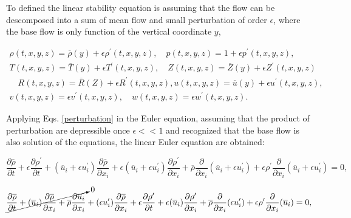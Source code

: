 
To defined the linear stability equation is assuming that 
the flow can be descomposed  into  a sum of mean flow and 
small perturbation of order $\epsilon$, where the base flow 
is only function of the vertical coordinate $y$,  

\begin{equation}
\begin{split}
   \rho(t,x,y,z)=\overline{\rho}(y)+\epsilon\rho^\prime(t,x,y,z) 
   ,
   \quad
   p(t,x,y,z)=1+\epsilon p^\prime(t,x,y,z) 
   ,
   \\
   T(t,x,y,z)=\overline{T}(y)+\epsilon T^\prime(t,x,y,z) 
   ,
   \quad
   Z(t,x,y,z)=\overline{Z}(y)+\epsilon Z^\prime(t,x,y,z) 
    \\
   \quad
   R(t,x,y,z)=\overline{R}(Z)+\epsilon R^\prime(t,x,y,z) 
   ,
   u(t,x,y,z)=\overline{u}(y)+\epsilon u^\prime(t,x,y,z) 
   ,
   \quad
   \\
   v(t,x,y,z)=\epsilon v^\prime(t,x,y,z) 
   ,
   \quad
   w(t,x,y,z)=\epsilon w^\prime(t,x,y,z) 
   .
\end{split}
\label{perturbation}
\end{equation}

Applying Eqs. \ref{perturbation} in the Euler equation,  
assuming that the product of perturbation are depressible once $\epsilon<<1$ 
and recognized that the base flow is also solution of the equations, the 
linear Euler equation are obtained:

\begin{equation*} 
\frac{\partial \overline{\rho}}{\partial t}
+
\epsilon
\frac{\partial\rho^{\prime}}{\partial t}
+
(\overline{u}_i+\epsilon u^{\prime}_i)
\frac{\partial \overline{\rho}}{\partial x_i} 
+
\epsilon
(\overline{u}_i+\epsilon u^{\prime}_i)
\frac{\partial \rho^{\prime}}{\partial x_i} 
+
\overline{\rho}
\frac{\partial}{\partial x_i}
(\overline{u}_i+\epsilon u^{\prime}_i)
+
\epsilon
\rho^{\prime}
\frac{\partial }{\partial x_i}
(\overline{u}_i+\epsilon u^{\prime}_i)
=
0
,
\end{equation*} 

\begin{equation*} 
\cancelto{0}{
\frac{\partial \overline{\rho}}{\partial t}
+
(\overline{u}_i)
\frac{\partial \overline{\rho}}{\partial x_i} 
+
\overline{\rho}
\frac{\partial\overline{u}_i}{\partial x_i}
}
+
(\epsilon u^{\prime}_i)
\frac{\partial \overline{\rho}}{\partial x_i} 
+
\epsilon
\frac{\partial\rho^{\prime}}{\partial t}
+
\epsilon
(\overline{u}_i)
\frac{\partial \rho^{\prime}}{\partial x_i} 
+
\overline{\rho}
\frac{\partial}{\partial x_i}
(\epsilon u^{\prime}_i)
+
\epsilon
\rho^{\prime}
\frac{\partial }{\partial x_i}
(\overline{u}_i)
=
0
,
\end{equation*} 


